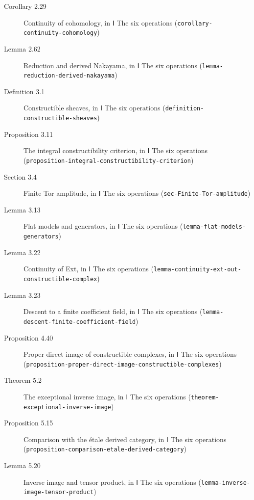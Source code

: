 \documentclass[11pt]{article}
\newcommand{\bpslug}[1]{\texttt{#1}}
\begin{document}
\begin{description}
\item[Corollary 2.29] Continuity of cohomology, in Ⅰ The six operations (\bpslug{corollary-{}\allowbreak{}continuity-{}\allowbreak{}cohomology})
\item[Lemma 2.62] Reduction and derived Nakayama, in Ⅰ The six operations (\bpslug{lemma-{}\allowbreak{}reduction-{}\allowbreak{}derived-{}\allowbreak{}nakayama})
\item[Definition 3.1] Constructible sheaves, in Ⅰ The six operations (\bpslug{definition-{}\allowbreak{}constructible-{}\allowbreak{}sheaves})
\item[Proposition 3.11] The integral constructibility criterion, in Ⅰ The six operations (\bpslug{proposition-{}\allowbreak{}integral-{}\allowbreak{}constructibility-{}\allowbreak{}criterion})
\item[Section 3.4] Finite Tor amplitude, in Ⅰ The six operations (\bpslug{sec-{}\allowbreak{}Finite-{}\allowbreak{}Tor-{}\allowbreak{}amplitude})
\item[Lemma 3.13] Flat models and generators, in Ⅰ The six operations (\bpslug{lemma-{}\allowbreak{}flat-{}\allowbreak{}models-{}\allowbreak{}generators})
\item[Lemma 3.22] Continuity of Ext, in Ⅰ The six operations (\bpslug{lemma-{}\allowbreak{}continuity-{}\allowbreak{}ext-{}\allowbreak{}out-{}\allowbreak{}constructible-{}\allowbreak{}complex})
\item[Lemma 3.23] Descent to a finite coefficient field, in Ⅰ The six operations (\bpslug{lemma-{}\allowbreak{}descent-{}\allowbreak{}finite-{}\allowbreak{}coefficient-{}\allowbreak{}field})
\item[Proposition 4.40] Proper direct image of constructible complexes, in Ⅰ The six operations (\bpslug{proposition-{}\allowbreak{}proper-{}\allowbreak{}direct-{}\allowbreak{}image-{}\allowbreak{}constructible-{}\allowbreak{}complexes})
\item[Theorem 5.2] The exceptional inverse image, in Ⅰ The six operations (\bpslug{theorem-{}\allowbreak{}exceptional-{}\allowbreak{}inverse-{}\allowbreak{}image})
\item[Proposition 5.15] Comparison with the étale derived category, in Ⅰ The six operations (\bpslug{proposition-{}\allowbreak{}comparison-{}\allowbreak{}etale-{}\allowbreak{}derived-{}\allowbreak{}category})
\item[Lemma 5.20] Inverse image and tensor product, in Ⅰ The six operations (\bpslug{lemma-{}\allowbreak{}inverse-{}\allowbreak{}image-{}\allowbreak{}tensor-{}\allowbreak{}product})

\end{description}
\end{document}
